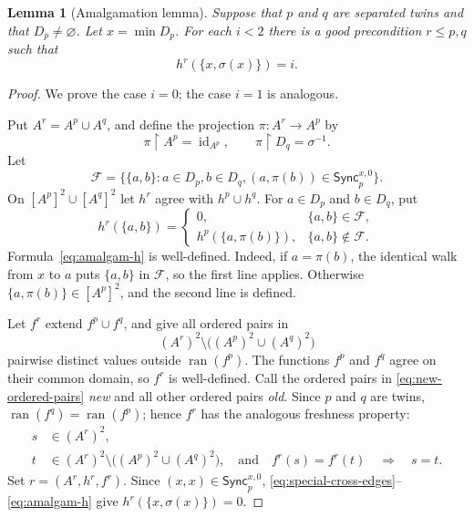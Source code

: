 \documentclass[10pt,a4paper]{amsart}
\numberwithin{equation}{section}
\newtheorem{lemma}[theorem]{Lemma}
\theoremstyle{definition}
\theoremstyle{remark}
\newcommand{\restr}{\mathbin{\upharpoonright}}
\begin{document}
\begin{lemma}[Amalgamation lemma]\label{lem:amalgamation}
Suppose that $p$ and $q$ are separated twins and that $D_p\ne\varnothing$.
Let $x=\min D_p$.  For each $i<2$ there is a good precondition
$r\leq p,q$ such that
\begin{displaymath}
 h^r(\{x,\sigma(x)\})=i.
\end{displaymath}
\end{lemma}

\begin{proof}
We prove the case $i=0$; the case $i=1$ is analogous.

Put $A^r=A^p\cup A^q$, and define the projection $\pi:A^r\to A^p$ by
\begin{displaymath}
 \pi\restr A^p=\operatorname{id}_{A^p},
 \qquad \pi\restr D_q=\sigma^{-1}.
\end{displaymath}
Let
\begin{equation}\label{eq:special-cross-edges}
 \mathcal F=
 \bigl\{\{a,b\}:a\in D_p, b\in D_q,
        (a,\pi(b))\in\mathsf{Sync}^{x,0}_p\bigr\}.
\end{equation}
On $[A^p]^2\cup[A^q]^2$ let $h^r$ agree with $h^p\cup h^q$.
For $a\in D_p$ and $b\in D_q$, put
\begin{equation}\label{eq:amalgam-h}
 h^r(\{a,b\})=
 \begin{cases}
 0,&\{a,b\}\in\mathcal F,\\
 h^p(\{a,\pi(b)\}),&\{a,b\}\notin\mathcal F.
 \end{cases}
\end{equation}
Formula~\eqref{eq:amalgam-h} is well-defined.  Indeed, if $a=\pi(b)$,
the identical
walk from $x$ to $a$ puts $\{a,b\}$ in $\mathcal F$, so the first line
applies.  Otherwise $\{a,\pi(b)\}\in[A^p]^2$, and the second line is
defined.

Let $f^r$ extend $f^p\cup f^q$, and give all ordered pairs in
\begin{equation}\label{eq:new-ordered-pairs}
 (A^r)^2\setminus\bigl((A^p)^2\cup(A^q)^2\bigr)
\end{equation}
pairwise distinct values outside $\operatorname{ran}(f^p)$.
The functions $f^p$ and $f^q$ agree on their common domain, so $f^r$ is
well-defined.  Call the ordered pairs in
\eqref{eq:new-ordered-pairs} \emph{new} and all other
ordered pairs \emph{old}.  Since $p$ and $q$ are twins,
$\operatorname{ran}(f^q)=\operatorname{ran}(f^p)$; hence $f^r$ has the
analogous freshness property:
\begin{displaymath}
 \begin{aligned}
 s&\in(A^r)^2,\\
 t&\in(A^r)^2\setminus\bigl((A^p)^2\cup(A^q)^2\bigr),
 \quad\text{and}\quad f^r(s)=f^r(t)
 \quad\Longrightarrow\quad s=t.
 \end{aligned}                                           \tag{$F_r$}
\end{displaymath}
Set $r=(A^r,h^r,f^r)$.  Since
$(x,x)\in\mathsf{Sync}^{x,0}_p$,
\eqref{eq:special-cross-edges}--\eqref{eq:amalgam-h} give
$h^r(\{x,\sigma(x)\})=0$.


\end{proof}
\end{document}
